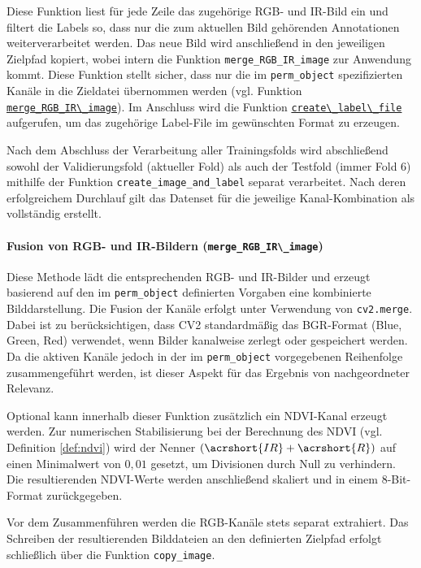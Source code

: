 Diese Funktion liest für jede Zeile das zugehörige \acrshort{RGB}- und \acrshort{IR}-Bild ein und filtert die Labels so, dass nur die zum aktuellen Bild gehörenden Annotationen weiterverarbeitet werden. Das neue Bild wird anschließend in den jeweiligen Zielpfad kopiert, wobei intern die Funktion \lstinline|merge_RGB_IR_image| zur Anwendung kommt. Diese Funktion stellt sicher, dass nur die im \lstinline|perm_object| spezifizierten Kanäle in die Zieldatei übernommen werden (vgl. Funktion \hyperlink{par:merge_RGB_IR}{\lstinline|merge_RGB_IR\_image|}). Im Anschluss wird die Funktion \hyperlink{par:create_label_file}{\lstinline|create\_label\_file|} aufgerufen, um das zugehörige Label-File im gewünschten Format zu erzeugen.

Nach dem Abschluss der Verarbeitung aller Trainingsfolds wird abschließend sowohl der Validierungsfold (aktueller Fold) als auch der Testfold (immer Fold 6) mithilfe der Funktion \lstinline|create_image_and_label| separat verarbeitet. Nach deren erfolgreichem Durchlauf gilt das Datenset für die jeweilige Kanal-Kombination als vollständig erstellt.

\paragraph{Fusion von RGB- und IR-Bildern (\lstinline|merge_RGB_IR\_image|)}
\hypertarget{par:merge_RGB_IR}{}
Diese Methode lädt die entsprechenden \acrshort{RGB}- und \acrshort{IR}-Bilder und erzeugt basierend auf den im \lstinline|perm_object| definierten Vorgaben eine kombinierte Bilddarstellung. Die Fusion der Kanäle erfolgt unter Verwendung von \lstinline|cv2.merge|. Dabei ist zu berücksichtigen, dass \acrshort{CV2} standardmäßig das BGR-Format (Blue, Green, Red) verwendet, wenn Bilder kanalweise zerlegt oder gespeichert werden. Da die aktiven Kanäle jedoch in der im \lstinline|perm_object| vorgegebenen Reihenfolge zusammengeführt werden, ist dieser Aspekt für das Ergebnis von nachgeordneter Relevanz.

Optional kann innerhalb dieser Funktion zusätzlich ein \acrshort{NDVI}-Kanal erzeugt werden. Zur numerischen Stabilisierung bei der Berechnung des \acrshort{NDVI} (vgl. Definition \ref{def:ndvi}) wird der Nenner $(\acrshort{IR} + \acrshort{R})$ auf einen Minimalwert von $0{,}01$ gesetzt, um Divisionen durch Null zu verhindern. Die resultierenden \acrshort{NDVI}-Werte werden anschließend skaliert und in einem 8-Bit-Format zurückgegeben.

Vor dem Zusammenführen werden die \acrshort{RGB}-Kanäle stets separat extrahiert. Das Schreiben der resultierenden Bilddateien an den definierten Zielpfad erfolgt schließlich über die Funktion \lstinline|copy_image|.


